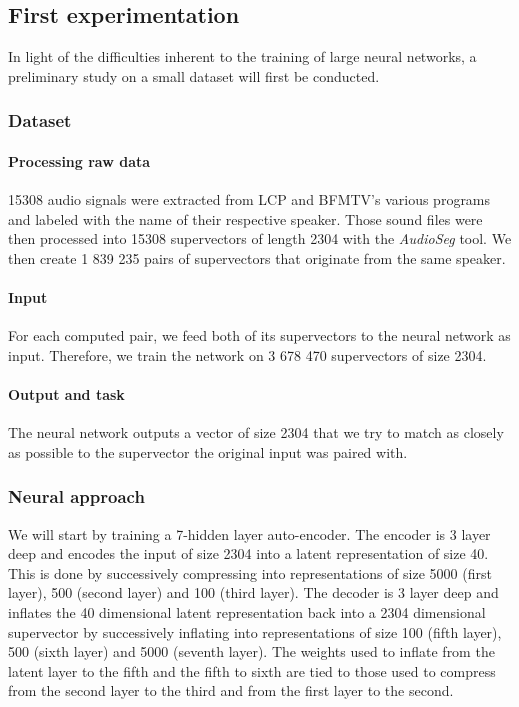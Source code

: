 \documentclass[conference]{IEEEtran}
\begin{document}
\subsection{First experimentation}

In light of the difficulties inherent to the training of large neural networks,
a preliminary study on a small dataset will first be conducted.

\subsubsection{Dataset}

\paragraph{Processing raw data}

15308 audio signals were extracted from LCP and BFMTV's various programs and labeled
with the name of their respective speaker. Those sound files were then processed
into 15308 supervectors of length 2304 with the \emph{AudioSeg} tool.
We then create 1 839 235 pairs of supervectors that originate from the same
speaker.

\paragraph{Input}

For each computed pair, we feed both of its supervectors to the neural network as
input. Therefore, we train the network on 3 678 470 supervectors of size 2304.

\paragraph{Output and task}

The neural network outputs a vector of size 2304 that we try to match as closely
as possible to the supervector the original input was paired with.

\subsubsection{Neural approach}
We will start by training a 7-hidden layer auto-encoder.
The encoder is 3 layer
deep and encodes the input of size 2304 into a latent representation of size 40.
This is done by successively compressing into representations of size 5000
(first layer), 500 (second layer) and 100 (third layer).
The decoder is 3 layer deep and inflates the 40 dimensional latent
representation back into a 2304 dimensional supervector by successively
inflating into representations of size 100 (fifth layer), 500 (sixth layer) and
5000 (seventh layer). The weights used to inflate from the latent layer to the
fifth and the fifth to sixth are tied to those used to compress from the second
layer to the third and from the first
layer to the second.
\end{document}
